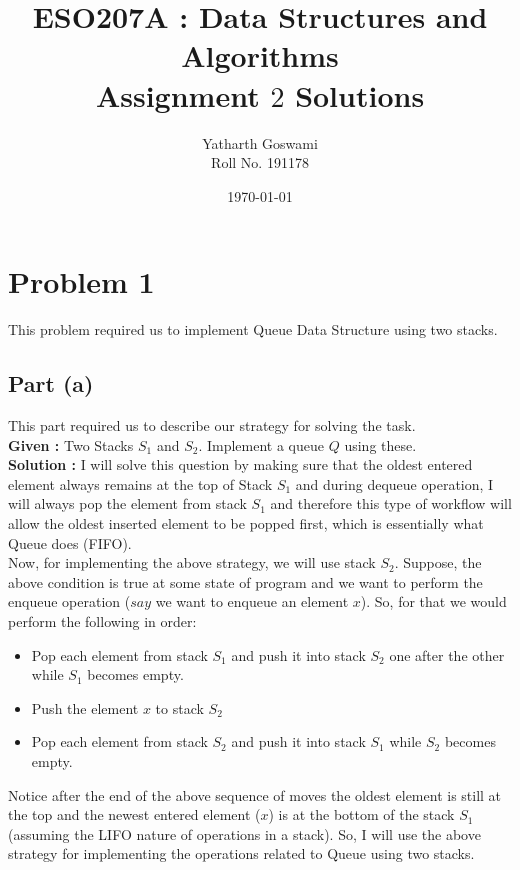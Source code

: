 \documentclass{article}
\title{\vspace{80mm}\lightgreyb ESO207A : Data Structures and Algorithms \\
\lightgreyb Assignment $2$ Solutions}
\author{Yatharth Goswami \\
Roll No. 191178}
\date{\today}
\begin{document}
\DeclarePairedDelimiter{\ceil}{\lceil}{\rceil}
\DeclarePairedDelimiter{\floor}{\lfloor}{\rfloor}
\clearpage\maketitle
\thispagestyle{empty}
\newpage
\setcounter{page}{1}

\section{Problem 1}{
    This problem required us to implement Queue Data Structure using two stacks.  
    \subsection{Part (a)}{
        This part required us to describe our strategy for solving the task. \newline \\
        \textbf{Given : } Two Stacks $S_1$ and $S_2$. Implement a queue $Q$ using these.\\
        \textbf{Solution :} I will solve this question by making sure that the oldest entered element always remains at the top of Stack $S_1$ and during dequeue operation, I will always pop the element from stack $S_1$ and therefore this type of workflow will allow the oldest inserted element to be popped first, which is essentially what Queue does (FIFO). \\
        Now, for implementing the above strategy, we will use stack $S_2$. Suppose, the above condition is true at some state of program and we want to perform the enqueue operation ($say$ we want to enqueue an element $x$). So, for that we would perform the following in order:
        \begin {itemize} 
        \item Pop each element from stack $S_1$ and push it into stack $S_2$ one after the other while $S_1$ becomes empty.
        \item Push the element $x$ to stack $S_2$ 
        \item Pop each element from stack $S_2$ and push it into stack $S_1$ while $S_2$ becomes empty.
        \end {itemize}
        Notice after the end of the above sequence of moves the oldest element is still at the top and the newest entered element ($x$) is at the bottom of the stack $S_1$ (assuming the LIFO nature of operations in a stack). So, I will use the above strategy for implementing the operations related to Queue using two stacks. \hfill \qedsymbol 
    }
}
\end{document}
